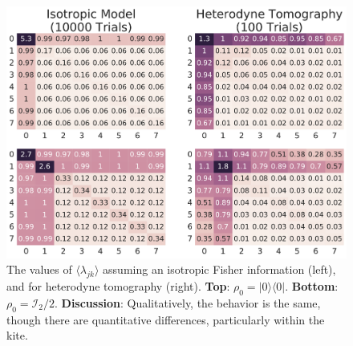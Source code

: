 \documentclass[aps,pra, twocolumn]{revtex4-1}
\begin{document}
 
\begin{figure}[h]
  \includegraphics[width=\columnwidth]{Images/Figure_10.pdf}
 \caption{The values of $\langle \lambda_{jk} \rangle$ assuming an isotropic Fisher information (left), and for heterodyne tomography (right). \textbf{Top}: $\rho_{0} = |0\rangle\langle 0|$. \textbf{Bottom}: $\rho_{0} = \mathcal{I}_{2}/2$. \textbf{Discussion}: Qualitatively, the behavior is the same, though there are quantitative differences, particularly within the kite.}
\label{fig:model_comparison}
\end{figure}
\end{document}

